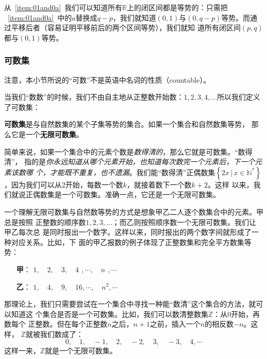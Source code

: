 从~\ref{item:01and0a}~我们可以知道所有$\mathbb{R}$上的闭区间都是等势的：只需把%
~\ref{item:01and0a}~中的$a$替换成$q-p$，我们就知道$\left( 0,1 \right) $与$\left( 
0,q-p \right) $等势。而通过平移后者（容易证明平移前后的两个区间等势），我们就知
道所有闭区间$\left( p,q\right) $都与$\left( 0,1 \right) $等势。

\subsubsection{可数集}

注意，本小节所说的“可数”不是英语中名词的性质（countable）。

当我们“数数”的时候，我们不由自主地从正整数开始数：$1,2,3,4,\ldots $所以我们定义
了可数集：

\begin{rawdef}[可数集]
    \textbf{可数集}是与自然数集的某个子集等势的集合。如果一个集合和自然数集等势，
    那么它是一个\textbf{无限可数集}。
\end{rawdef}

简单来说，如果一个集合中的元素个数是\emph{数得清的}，那么它就是可数集。“数得清”，
指的是\emph{你永远知道从哪个元素开始，也知道每次数完一个元素后，下一个元素该数哪
个，才能既不重复，也不遗漏}。我们能“数得清”正偶数集$\left\{ 2x\,|\,x\in\mathbb{N}
^\ast\right\} $，因为我们可以从2开始，每数一个数$k$，就接着数下一个数$k+2$。这样
以来，我们就说正偶数集是一个可数集。准确一点，它还是一个无限可数集。

一个理解无限可数集与自然数等势的方式是想象甲乙二人逐个数集合中的元素。甲总是按照
正整数的顺序数$1,2,3,\ldots $；而乙则按照顺序数一个无限可数集。我们让甲乙每次总
是同时报出一个数字。这样以来，同时报出的两个数字间就形成了一种对应关系。比如，下
面的甲乙报数的例子体现了正整数集和完全平方数集等势：

\begin{itemize}
    \item[\textbf{甲}：] $1,\quad 2,\quad 3,\quad 4\,\ , \cdots,\quad n\,\ , \cdots$

    \item[\textbf{乙}：] $1,\quad 4,\quad 9,\quad 16, \cdots,\quad n^2, \cdots$
\end{itemize}

那理论上，我们只需要尝试在一个集合中寻找一种能“数清”这个集合的方法，就可以知道这
个集合是否是一个可数集。比如，我们可以数清整数集$\mathbb{Z}$：从0开始，再数每个
正整数。但在每个正整数$n$之后，$n+1$之前，插入一个$n$的相反数$-n$。这样，
$\mathbb{Z}$就被我们数成了：
\[
    0,\quad 1,\quad -1,\quad 2,\quad -2,\quad 3,\quad -3,\quad 4,\cdots
\]
这样一来，$\mathbb{Z}$就是一个无限可数集。

